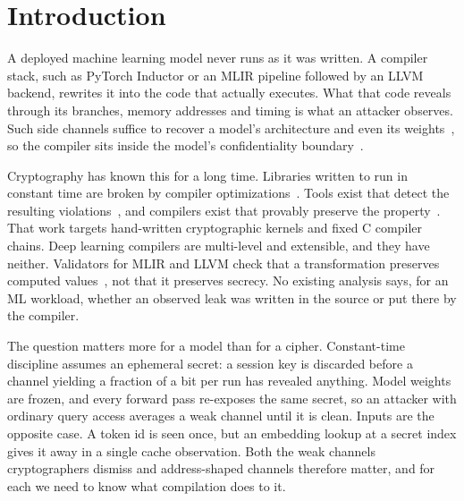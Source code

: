 
\section{Introduction}
\label{sec:intro}

A deployed machine learning model never runs as it was written.
A compiler stack, such as PyTorch Inductor or an MLIR pipeline
followed by an LLVM backend, rewrites it into the code that actually
executes. What that code reveals through its branches, memory
addresses and timing is what an attacker observes. Such side channels
suffice to recover a model's architecture and even its
weights~\cite{batina2019csinn,yan2020cachetelepathy,hu2020deepsniffer},
so the compiler sits inside the model's confidentiality
boundary~\cite{chen2026compilerbackdoor,simon2018whatyouc}.

Cryptography has known this for a long time. Libraries written to run
in constant time are broken by compiler
optimizations~\cite{simon2018whatyouc,daniel2020binsecrel,kyberslash2024}.
Tools exist that detect the resulting
violations~\cite{almeida2016ctverif,daniel2020binsecrel},
and compilers exist that provably preserve the
property~\cite{barthe2020ctcompiler}.
That work targets hand-written cryptographic kernels and fixed C
compiler chains. Deep learning compilers are multi-level and
extensible, and they have neither. Validators for MLIR and LLVM check
that a transformation preserves computed
values~\cite{fcvd2025,lopes2021alive2,wang2024mlirtv},
not that it preserves secrecy. No existing analysis says, for an ML
workload, whether an observed leak was written in the source or put
there by the compiler.

The question matters more for a model than for a cipher.
Constant-time discipline assumes an ephemeral secret: a session key is
discarded before a channel yielding a fraction of a bit per run has
revealed anything. Model weights are frozen, and every forward pass
re-exposes the same secret, so an attacker with ordinary query access
averages a weak channel until it is clean. Inputs are the opposite
case. A token id is seen once, but an embedding lookup at a secret
index gives it away in a single cache observation. Both the weak
channels cryptographers dismiss and address-shaped channels therefore
matter, and for each we need to know what compilation does to it.

